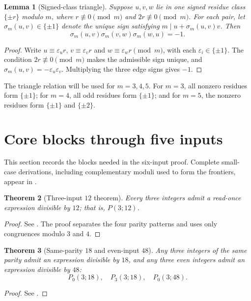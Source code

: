 \documentclass[11pt]{amsart}
\newtheorem{theorem}{Theorem}[section]
\newtheorem{lemma}[theorem]{Lemma}
\theoremstyle{definition}
\theoremstyle{remark}
\begin{document}
\begin{lemma}[Signed-class triangle]\label{lem:triangle}
Suppose $u,v,w$ lie in one signed residue class $\{\pm r\}$ modulo $m$,
where $r\not\equiv0\pmod m$ and $2r\not\equiv0\pmod m$.  For each pair,
let $\sigma_m(u,v)\in\{\pm1\}$ denote the unique sign satisfying
$m\mid u+\sigma_m(u,v)v$.  Then
\[
 \sigma_m(u,v)\sigma_m(v,w)\sigma_m(w,u)=-1.
\]
\end{lemma}
\begin{proof}
Write $u\equiv\varepsilon_ur$, $v\equiv\varepsilon_vr$ and
$w\equiv\varepsilon_wr\pmod m$, with each $\varepsilon_i\in\{\pm1\}$.
The condition $2r\not\equiv0\pmod m$ makes the admissible sign unique, and
$\sigma_m(u,v)=-\varepsilon_u\varepsilon_v$.  Multiplying the three edge
signs gives $-1$.
\end{proof}

The triangle relation will be used for $m=3,4,5$.  For $m=3$, all nonzero
residues form $\{\pm1\}$; for $m=4$, all odd residues form $\{\pm1\}$; and
for $m=5$, the nonzero residues form $\{\pm1\}$ and $\{\pm2\}$.

\section{Core blocks through five inputs}

This section records the blocks needed in the six-input proof.  Complete
small-case derivations, including complementary moduli used to form the
frontiers, appear in .

\begin{theorem}[Three-input $12$ theorem]\label{thm:three12}
Every three integers admit a read-once expression divisible by $12$; that is,
$P(3;12)$.
\end{theorem}
\begin{proof}
See .  The proof separates the four parity patterns and
uses only congruences modulo $3$ and $4$.
\end{proof}

\begin{theorem}[Same-parity $18$ and even-input $48$]\label{thm:threeprofiles}
Any three integers of the same parity admit an expression divisible by $18$,
and any three even integers admit an expression divisible by $48$:
\[
 P_0(3;18),\quad P_3(3;18),\quad P_0(3;48).
\]
\end{theorem}
\begin{proof}
See .
\end{proof}
\end{document}

